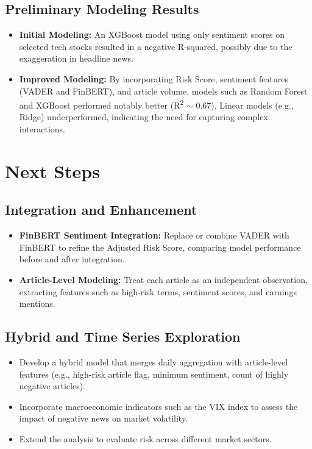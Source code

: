 \documentclass[twocolumn]{article}
\begin{document}
\subsection{Preliminary Modeling Results}
\begin{itemize}
    \item \textbf{Initial Modeling:} An XGBoost model using only sentiment scores on selected tech stocks resulted in a negative R-squared, possibly due to the exaggeration in headline news.
    \item \textbf{Improved Modeling:} By incorporating Risk Score, sentiment features (VADER and FinBERT), and article volume, models such as Random Forest and XGBoost performed notably better (R\textsuperscript{2} $\sim$ 0.67). Linear models (e.g., Ridge) underperformed, indicating the need for capturing complex interactions.
\end{itemize}

\section{Next Steps}
\subsection{Integration and Enhancement}
\begin{itemize}
    \item \textbf{FinBERT Sentiment Integration:} Replace or combine VADER with FinBERT to refine the Adjusted Risk Score, comparing model performance before and after integration.
    \item \textbf{Article-Level Modeling:} Treat each article as an independent observation, extracting features such as high-risk terms, sentiment scores, and earnings mentions.
\end{itemize}

\subsection{Hybrid and Time Series Exploration}
\begin{itemize}
    \item Develop a hybrid model that merges daily aggregation with article-level features (e.g., high-risk article flag, minimum sentiment, count of highly negative articles).
    \item Incorporate macroeconomic indicators such as the VIX index to assess the impact of negative news on market volatility.
    \item Extend the analysis to evaluate risk across different market sectors.
\end{itemize}
\end{document}
